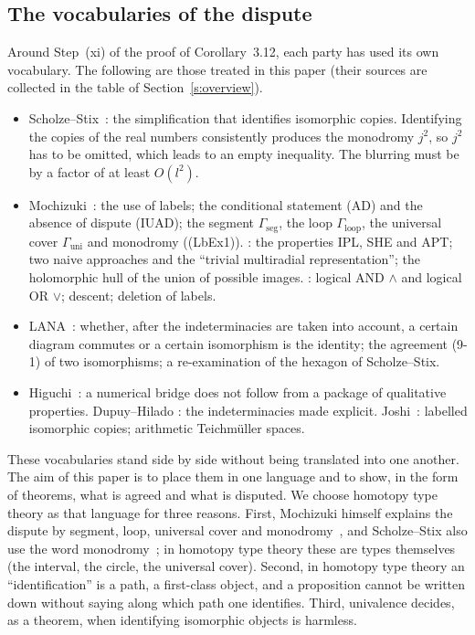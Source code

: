 \documentclass[11pt,a4paper]{article}
\newcommand{\Gseg}{\Gamma_{\mathrm{seg}}}
\newcommand{\Gloop}{\Gamma_{\mathrm{loop}}}
\newcommand{\Guni}{\Gamma_{\mathrm{uni}}}
\newcommand{\q}[1]{``#1''}
\theoremstyle{plain}
\theoremstyle{definition}
\theoremstyle{remark}
\begin{document}
\subsection{The vocabularies of the dispute}
Around Step~(xi) of the proof of Corollary~3.12, each party has used its own vocabulary. The following are those
treated in this paper (their sources are collected in the table of Section~\ref{s:overview}).
\begin{itemize}
\item Scholze--Stix~\cite{SS}: the simplification that identifies isomorphic copies. Identifying the copies of the
real numbers consistently produces the monodromy $j^2$, so $j^2$ has to be omitted, which leads to an empty
inequality. The blurring must be by a factor of at least $O(l^2)$.
\item Mochizuki~\cite{R18}: the use of labels; the conditional statement (AD) and the absence of dispute (IUAD); the
segment $\Gseg$, the loop $\Gloop$, the universal cover $\Guni$ and monodromy ((LbEx1)). \cite{IUT3}: the properties
IPL, SHE and APT; two naive approaches and the \q{trivial multiradial representation}; the holomorphic hull of the union of possible images.
\cite{Ess}: logical AND $\wedge$ and logical OR $\vee$; descent; deletion of labels.
\item LANA~\cite{LANA}: whether, after the indeterminacies are taken into account, a certain diagram commutes or a
certain isomorphism is the identity; the agreement (9-1) of two isomorphisms; a re-examination of the hexagon of
Scholze--Stix.
\item Higuchi~\cite{Hi}: a numerical bridge does not follow from a package of qualitative properties. Dupuy--Hilado
\cite{DH1}: the indeterminacies made explicit. Joshi~\cite{Jo1,Jo2}: labelled isomorphic copies; arithmetic
Teichm\"uller spaces.
\end{itemize}
These vocabularies stand side by side without being translated into one another. The aim of this paper is to place
them in one language and to show, in the form of theorems, what is agreed and what is disputed. We choose homotopy type
theory as that language for three reasons. First, Mochizuki himself explains the dispute by segment, loop, universal
cover and monodromy~\cite[(LbEx1)]{R18}, and Scholze--Stix also use the word monodromy~\cite[\S2.2]{SS}; in homotopy
type theory these are types themselves (the interval, the circle, the universal cover). Second, in homotopy type theory
an ``identification'' is a path, a first-class object, and a proposition cannot be written down without saying along
which path one identifies. Third, univalence decides, as a theorem, when identifying isomorphic objects is harmless.
\end{document}
